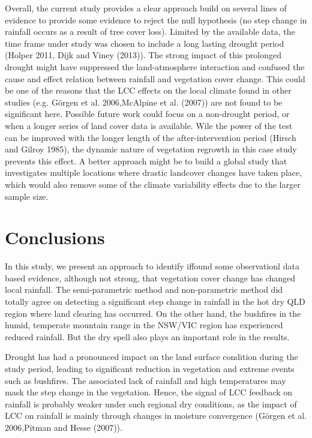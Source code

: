 \documentclass[fleqn,10pt,lineno]{wlpeerj} %
\begin{document}
Overall, the current study provides a clear approach build on several
lines of evidence to provide some evidence to reject the null hypothesis
(no step change in rainfall occurs as a result of tree cover loss).
Limited by the available data, the time frame under study was chosen to
include a long lasting drought period (Holper 2011, Dijk and Viney
(2013)). The strong impact of this prolonged drought might have
suppressed the land-atmosphere interaction and confused the cause and
effect relation between rainfall and vegetation cover change. This could
be one of the reasons that the LCC effects on the local climate found in
other studies (e.g. Görgen et al. 2006,McAlpine et al. (2007)) are not
found to be significant here. Possible future work could focus on a
non-drought period, or when a longer series of land cover data is
available. Wile the power of the test can be improved with the longer
length of the after-intervention period (Hirsch and Gilroy 1985), the
dynamic nature of vegetation regrowth in this case study prevents this
effect. A better approach might be to build a global study that
investigates multiple locations where drastic landcover changes have
taken place, which would also remove some of the climate variability
effects due to the larger sample size.

\section{Conclusions}\label{conclusions}

In this study, we present an approach to identify iffound some
observationl data based evidence, although not strong, that vegetation
cover change has changed local rainfall. The semi-parametric method and
non-parametric method did totally agree on detecting a significant step
change in rainfall in the hot dry QLD region where land clearing has
occurred. On the other hand, the bushfires in the humid, temperate
mountain range in the NSW/VIC region has experienced reduced rainfall.
But the dry spell also plays an important role in the results.

Drought has had a pronounced impact on the land surface condition during
the study period, leading to significant reduction in vegetation and
extreme events such as bushfires. The associated lack of rainfall and
high temperatures may mask the step change in the vegetation. Hence, the
signal of LCC feedback on rainfall is probably weaker under such
regional dry conditions, as the impact of LCC on rainfall is mainly
through changes in moisture convergence (Görgen et al. 2006,Pitman and
Hesse (2007)).
\end{document}

